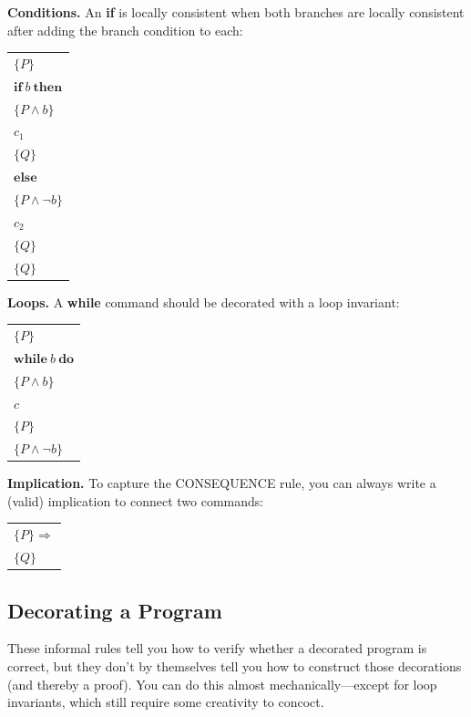 \noindent\textbf{Conditions.} An \textbf{if} is locally consistent when both branches are
locally consistent after adding the branch condition to each:
\begin{center}
\begin{tabular}{l}
$\{P\}$ \\
$\mathbf{if}\ b\ \mathbf{then}$ \\
\qquad $\{P \wedge b\}$ \\
\qquad $c_1$ \\
\qquad $\{Q\}$ \\
$\mathbf{else}$ \\
\qquad $\{P \wedge \neg b\}$ \\
\qquad $c_2$ \\
\qquad $\{Q\}$ \\
$\{Q\}$
\end{tabular}
\end{center}

\noindent\textbf{Loops.} A \textbf{while} command should be decorated with a loop invariant:
\begin{center}
\begin{tabular}{l}
$\{P\}$ \\
$\mathbf{while}\ b\ \mathbf{do}$ \\
\qquad $\{P \wedge b\}$ \\
\qquad $c$ \\
\qquad $\{P\}$ \\
$\{P \wedge \neg b\}$
\end{tabular}
\end{center}

\noindent\textbf{Implication.} To capture the CONSEQUENCE rule, you can always write a (valid)
implication to connect two commands:
\begin{center}
\begin{tabular}{l}
$\{P\} \Rightarrow$ \\
$\{Q\}$
\end{tabular}
\end{center}


\subsection{Decorating a Program}

These informal rules tell you how to verify whether a decorated program is correct, but they
don't by themselves tell you how to construct those decorations (and thereby a proof). You can
do this almost mechanically---except for loop invariants, which still require some creativity
to concoct.

